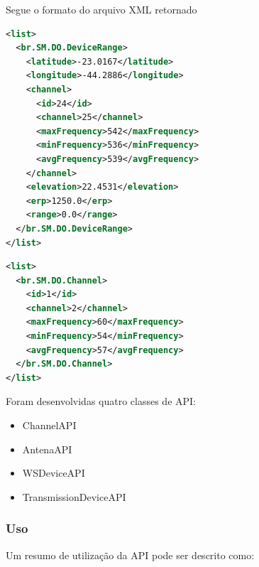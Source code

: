\FloatBarrier

Segue o formato do arquivo XML retornado 

\begin{lstlisting}[language=XML]
<list>
  <br.SM.DO.DeviceRange>
    <latitude>-23.0167</latitude>
    <longitude>-44.2886</longitude>
    <channel>
      <id>24</id>
      <channel>25</channel>
      <maxFrequency>542</maxFrequency>
      <minFrequency>536</minFrequency>
      <avgFrequency>539</avgFrequency>
    </channel>
    <elevation>22.4531</elevation>
    <erp>1250.0</erp>
    <range>0.0</range>
  </br.SM.DO.DeviceRange>
</list>		
\end{lstlisting}

\begin{lstlisting}[language=XML]
<list>
  <br.SM.DO.Channel>
    <id>1</id>
    <channel>2</channel>
    <maxFrequency>60</maxFrequency>
    <minFrequency>54</minFrequency>
    <avgFrequency>57</avgFrequency>
  </br.SM.DO.Channel>
</list>	
\end{lstlisting}


Foram desenvolvidas quatro classes de API:

\begin{itemize}
\item ChannelAPI
\item AntenaAPI
\item WSDeviceAPI
\item TransmissionDeviceAPI
\end{itemize}


\FloatBarrier

\subsubsection{Uso}

Um resumo de utilização da API pode ser descrito como:


